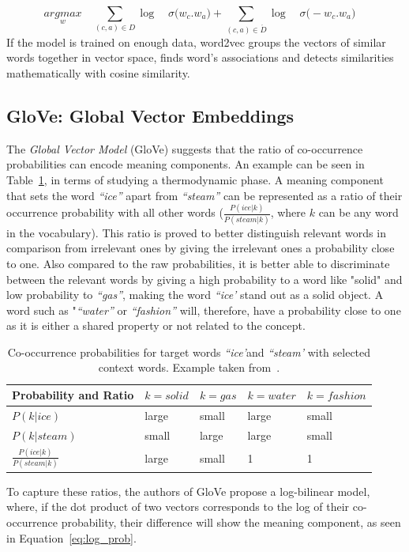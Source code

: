\begin{equation}
\label{eq:w2v_negative}
\underset { w }{ { argmax } } \quad \sum _{ (c,a)\in D }^{  }{ \log { \quad \sigma ( } w_{ c }.w_{ a }) } +\sum _{ (c,a)\in \acute { D }  }^{  }{ \log { \quad \sigma ( } -w_{ c }.w_{ a })\quad  } 
\end{equation}
If the model is trained on enough data, word2vec groups the vectors of similar words together in vector space, finds word’s associations and detects similarities mathematically with cosine similarity. 
\subsection{GloVe: Global Vector Embeddings}
\label{subsec:GloVe}
The \emph{Global Vector Model} (GloVe) suggests that the ratio of co-occurrence probabilities can encode meaning components. An example can be seen in Table~\ref{table:tab_1}, in terms of studying a thermodynamic phase. A meaning component that sets the word  \emph{``ice''} apart from \emph{``steam''} can be represented as  a ratio of their occurrence probability with all other words \big($\frac { P(ice|k) }{ P(steam|k) } $, where $k$ can be any word in the vocabulary\big). This ratio is proved to better distinguish relevant words in comparison from irrelevant ones by giving the irrelevant ones a probability close to one. Also compared to the raw probabilities, it is better able to discriminate
between the relevant words by giving a high probability to a word like "solid" and low probability to \emph{``gas''}, making the word \emph{``ice'} stand out as a solid object. A word such as "\emph{``water''} or \emph{``fashion''} will, therefore, have a probability close to one as it is either a shared property or not related to the concept.\\
\begin{table}[]
\centering

\begin{tabular}{@{}l|l|l|l|l@{}}
\toprule
Probability and Ratio &  $k=solid$& $k=gas$ & $k=water$ &$k= fashion$  \\ \midrule $P(k|ice)$& {\color[HTML]{CB0000}large} &  {\color[HTML]{329A9D}small} & {\color[HTML]{CB0000}large} & {\color[HTML]{329A9D}small} \\\midrule
  $P(k|steam)$&{\color[HTML]{329A9D}small}  & {\color[HTML]{CB0000}large} &  {\color[HTML]{CB0000}large}&{\color[HTML]{329A9D}small}  \\\midrule
 $\frac { P(ice|k) }{ P(steam|k) } $& {\color[HTML]{CB0000}large} &  {\color[HTML]{329A9D}small}&  1 &    1  \\\midrule
\end{tabular}%
\caption{Co-occurrence probabilities for target words \emph{``ice'}and \emph{``steam'} with selected context words. Example taken from~.}
\label{table:tab_1}
\end{table}
\noindent
To capture these ratios, the authors of GloVe propose a log-bilinear model, where, if the dot product of two vectors corresponds to the log of their co-occurrence probability, their difference will show the meaning component, as seen in Equation~\ref{eq:log_prob}.

